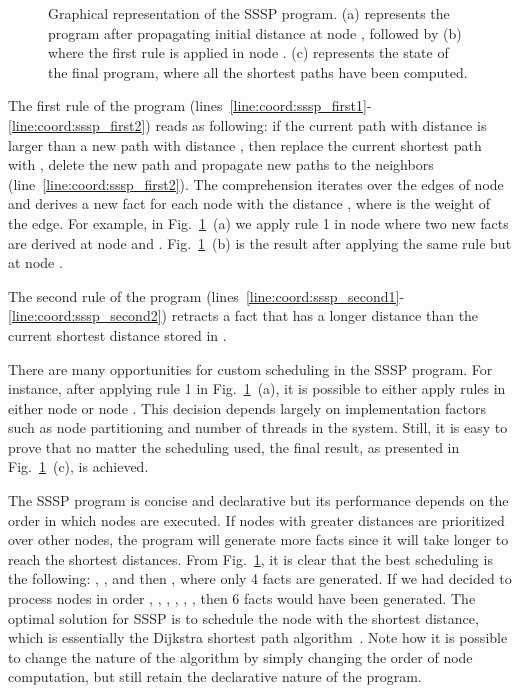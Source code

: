 \begin{figure}
\begin{center}
\begin{subfigure}[b]{0.4\textwidth}
      \caption{}
   \end{subfigure}
\end{center}
\caption{Graphical representation of the SSSP program. (a) represents the
   program after propagating initial distance at node , followed by
   (b) where the first rule is applied in node . (c)
   represents the state of the final program, where all the shortest paths
   have been computed.}
\label{fig:shortest_path_program}
\end{figure}

The first rule of the program
(lines~\ref{line:coord:sssp_first1}-\ref{line:coord:sssp_first2}) reads as
following: if the current  path  with distance 
is larger than a new path  with distance , then replace the
current shortest path with , delete the new  path and
propagate new paths to the neighbors
(line~\ref{line:coord:sssp_first2}). The comprehension iterates
over the edges of node  and derives a new  fact for each
node  with the distance , where  is the weight of
the edge. For example, in Fig.~\ref{fig:shortest_path_program}~(a) we apply rule
1 in node  where two new  facts are derived at node
 and . Fig.~\ref{fig:shortest_path_program}~(b) is the result
after applying the same rule but at node .

The second rule of the program
(lines~\ref{line:coord:sssp_second1}-\ref{line:coord:sssp_second2}) retracts a
 fact that has a longer distance than the current shortest distance
stored in .

There are many opportunities for custom scheduling in the SSSP program. For
instance, after applying rule 1 in Fig.~\ref{fig:shortest_path_program}~(a), it
is possible to either apply rules in either node  or node .
This decision depends largely on implementation factors such as node
partitioning and number of threads in the system. Still, it is easy to prove
that no matter the scheduling used, the final result, as presented in
Fig.~\ref{fig:shortest_path_program}~(c), is achieved.

The SSSP program is concise and declarative but its performance depends on the
order in which nodes are executed. If nodes with greater distances are
prioritized over other nodes, the program will generate more 
facts since it will take longer to reach the shortest distances. From
Fig.~\ref{fig:shortest_path_program}, it is clear that the best scheduling is
the following: , ,  and then , where
only 4  facts are generated. If we had decided to process nodes in
order , , , , ,
, then 6  facts would have been generated.  The optimal
solution for SSSP is to schedule the node with the shortest distance, which is
essentially the Dijkstra shortest path algorithm~\cite{Dijkstra}. Note how it is
possible to change the nature of the algorithm by simply changing the order of
node computation, but still retain the declarative nature of the program.

